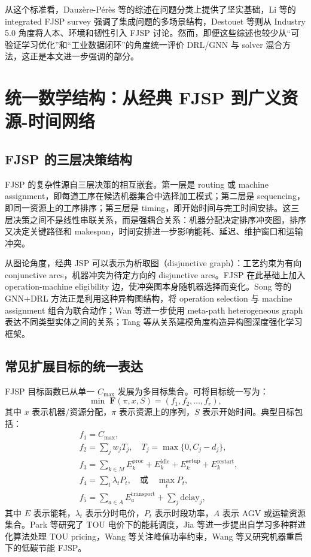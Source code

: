 \documentclass[UTF8,a4paper,11pt]{ctexart}
\newcommand{\Cmax}{C_{\max}}
\begin{document}
从这个标准看，Dauz\`ere-P\'er\`es 等的综述在问题分类上提供了坚实基础\cite{Dauzere-Peres2024}，Li 等的 integrated FJSP survey 强调了集成问题的多场景结构\cite{Li2022SurveyIntegrated}，Destouet 等则从 Industry 5.0 角度将人本、环境和韧性引入 FJSP 讨论\cite{Destouet2023Industry5}。然而，即便这些综述也较少从“可验证学习优化”和“工业数据闭环”的角度统一评价 DRL/GNN 与 solver 混合方法，这正是本文进一步强调的部分。

\section{统一数学结构：从经典 FJSP 到广义资源-时间网络}

\subsection{FJSP 的三层决策结构}

FJSP 的复杂性源自三层决策的相互嵌套。第一层是 routing 或 machine assignment，即每道工序在候选机器集合中选择加工模式；第二层是 sequencing，即同一资源上的工序排序；第三层是 timing，即开始时间与完工时间安排。这三层决策之间不是线性串联关系，而是强耦合关系：机器分配决定排序冲突图，排序又决定关键路径和 makespan，时间安排进一步影响能耗、延迟、维护窗口和运输冲突。

从图论角度，经典 JSP 可以表示为析取图（disjunctive graph）：工艺约束为有向 conjunctive arcs，机器冲突为待定方向的 disjunctive arcs。FJSP 在此基础上加入 operation-machine eligibility 边，使冲突图本身随机器选择而变化。Song 等的 GNN+DRL 方法正是利用这种异构图结构，将 operation selection 与 machine assignment 组合为联合动作\cite{Song2022GNNDRL}；Wan 等进一步使用 meta-path heterogeneous graph 表达不同类型实体之间的关系\cite{Wan2024MHGNN}；Tang 等从关系建模角度构造异构图深度强化学习框架\cite{Tang2024HGNNR}。

\subsection{常见扩展目标的统一表达}

FJSP 目标函数已从单一 $\Cmax$ 发展为多目标集合。可将目标统一写为：
\begin{equation}
\min \; \bm{F}(\pi,x,S)=\left(f_1,f_2,\ldots,f_r\right),
\end{equation}
其中 $x$ 表示机器/资源分配，$\pi$ 表示资源上的序列，$S$ 表示开始时间。典型目标包括：
\begin{align}
& f_1=\Cmax, \\
& f_2=\sum_j w_j T_j,\quad T_j=\max\{0,C_j-d_j\}, \\
& f_3=\sum_{k\in M} E_k^{\mathrm{proc}}+E_k^{\mathrm{idle}}+E_k^{\mathrm{setup}}+E_k^{\mathrm{restart}}, \\
& f_4=\sum_{t} \lambda_t P_t,\quad \text{或}\quad \max_t P_t, \\
& f_5=\sum_{a\in A} E_a^{\mathrm{transport}}+\sum_j \text{delay}_j,
\end{align}
其中 $E$ 表示能耗，$\lambda_t$ 表示分时电价，$P_t$ 表示时段功率，$A$ 表示 AGV 或运输资源集合。Park 等研究了 TOU 电价下的能耗调度\cite{Park2022TOU}，Jia 等进一步提出自学习多种群进化算法处理 TOU pricing\cite{Jia2024TOU}，Wang 等关注峰值功率约束\cite{Wang2024PeakPower}，Wang 等又研究机器重启下的低碳节能 FJSP\cite{Wang2025Restart}。
\end{document}
